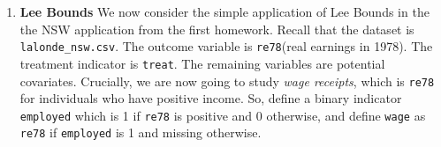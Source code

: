 \documentclass[11pt, a4paper]{article}
\begin{document}
\begin{enumerate}
\item \textbf{Lee Bounds} We now consider the simple application of Lee Bounds in the the NSW application from the first homework. Recall that the dataset is
\texttt{lalonde\_nsw.csv}. The outcome variable is \texttt{re78}(real earnings in 1978). The treatment indicator is
\texttt{treat}. The remaining variables are potential covariates. Crucially, we are now going to study \emph{wage receipts}, which is \texttt{re78} for individuals who have positive income. So, define a binary indicator \texttt{employed} which is 1 if \texttt{re78} is positive and 0 otherwise, and define \texttt{wage} as \texttt{re78} if \texttt{employed} is 1 and missing otherwise.


\end{enumerate}
\end{document}
